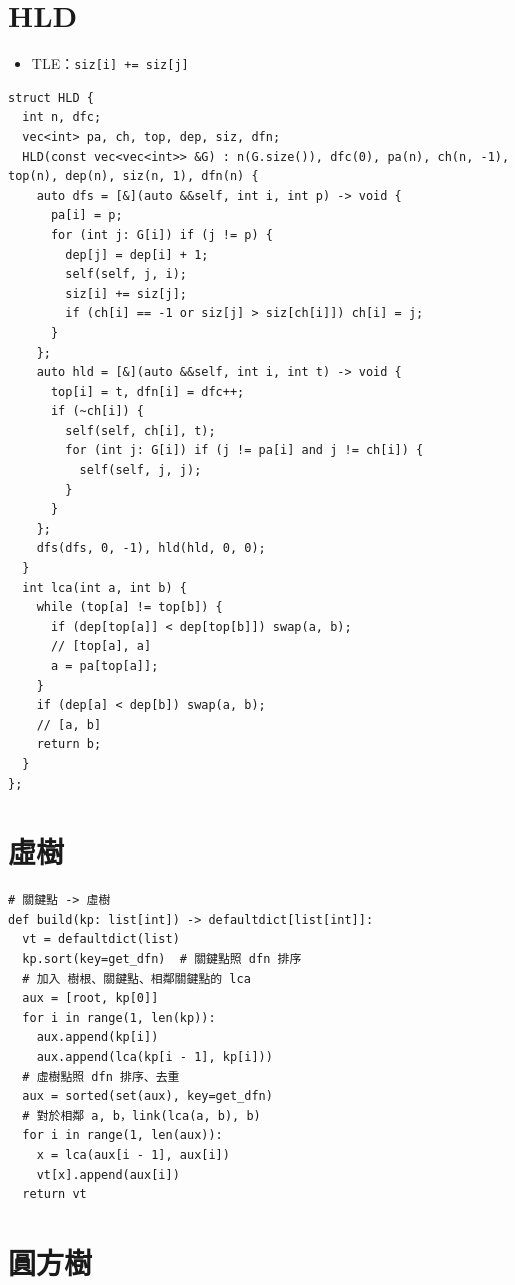 \documentclass[10pt, a4paper, twocolumn]{article}
\begin{document}
\section{HLD}

\begin{itemize}[tight_item]
    \item TLE：\texttt{siz[i] += siz[j]}
\end{itemize}

\begin{verbatim}
struct HLD {
  int n, dfc;
  vec<int> pa, ch, top, dep, siz, dfn;
  HLD(const vec<vec<int>> &G) : n(G.size()), dfc(0), pa(n), ch(n, -1), top(n), dep(n), siz(n, 1), dfn(n) {
    auto dfs = [&](auto &&self, int i, int p) -> void {
      pa[i] = p;
      for (int j: G[i]) if (j != p) {
        dep[j] = dep[i] + 1;
        self(self, j, i);
        siz[i] += siz[j];
        if (ch[i] == -1 or siz[j] > siz[ch[i]]) ch[i] = j;
      }
    };
    auto hld = [&](auto &&self, int i, int t) -> void {
      top[i] = t, dfn[i] = dfc++;
      if (~ch[i]) {
        self(self, ch[i], t);
        for (int j: G[i]) if (j != pa[i] and j != ch[i]) {
          self(self, j, j);
        }
      }
    };
    dfs(dfs, 0, -1), hld(hld, 0, 0);
  }
  int lca(int a, int b) {
    while (top[a] != top[b]) {
      if (dep[top[a]] < dep[top[b]]) swap(a, b);
      // [top[a], a]
      a = pa[top[a]];
    }
    if (dep[a] < dep[b]) swap(a, b);
    // [a, b]
    return b;
  }
};
\end{verbatim}

\section{虛樹}

\begin{verbatim}
# 關鍵點 -> 虛樹
def build(kp: list[int]) -> defaultdict[list[int]]:
  vt = defaultdict(list)
  kp.sort(key=get_dfn)  # 關鍵點照 dfn 排序
  # 加入 樹根、關鍵點、相鄰關鍵點的 lca
  aux = [root, kp[0]]
  for i in range(1, len(kp)):
    aux.append(kp[i])
    aux.append(lca(kp[i - 1], kp[i]))
  # 虛樹點照 dfn 排序、去重
  aux = sorted(set(aux), key=get_dfn)
  # 對於相鄰 a, b，link(lca(a, b), b)
  for i in range(1, len(aux)):
    x = lca(aux[i - 1], aux[i])
    vt[x].append(aux[i])
  return vt
\end{verbatim}

\section{圓方樹}
\end{document}

